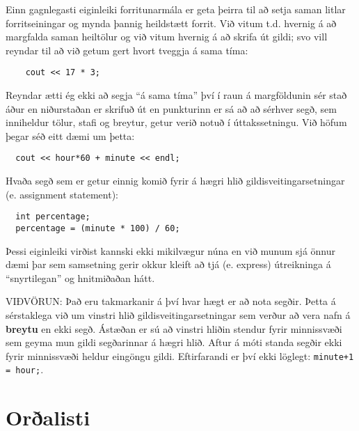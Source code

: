 Einn gagnlegasti eiginleiki forritunarmála er geta þeirra til að setja saman litlar forritseiningar og mynda þannig heildstætt forrit.
Við vitum t.d. hvernig á að margfalda saman heiltölur og við vitum hvernig á að skrifa út gildi; svo vill reyndar til að við getum gert hvort tveggja á sama tíma:

\begin{verbatim}
    cout << 17 * 3;
\end{verbatim}
%
Reyndar ætti ég ekki að segja ``á sama tíma'' því í raun á margföldunin sér stað áður en niðurstaðan er skrifuð út 
en punkturinn er sá að að sérhver segð, sem inniheldur tölur, stafi og breytur, getur verið notuð í úttakssetningu.
Við höfum þegar séð eitt dæmi um þetta:

\begin{verbatim}
  cout << hour*60 + minute << endl;
\end{verbatim}
%
Hvaða segð sem er getur einnig komið fyrir á hægri hlið gildisveitingarsetningar (e. assignment statement): 

\begin{verbatim}
  int percentage;
  percentage = (minute * 100) / 60;
\end{verbatim}
%
Þessi eiginleiki virðist kannski ekki mikilvægur núna en við munum sjá önnur dæmi þar sem samsetning gerir okkur kleift að tjá (e. express) útreikninga á ``snyrtilegan'' og hnitmiðaðan hátt.

VIÐVÖRUN: 
Það eru takmarkanir á því hvar hægt er að nota segðir.
Þetta á sérstaklega við um vinstri hlið gildisveitingarsetningar sem verður að vera nafn á {\bf breytu} en ekki segð.
Ástæðan er sú að vinstri hliðin stendur fyrir minnissvæði sem geyma mun gildi segðarinnar á hægri hlið.
Aftur á móti standa segðir ekki fyrir minnissvæði heldur eingöngu gildi.
Eftirfarandi er því ekki löglegt: {\tt minute+1 = hour;}.

\section{Orðalisti}

